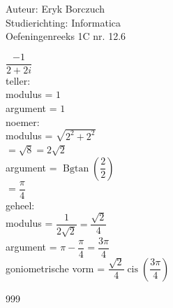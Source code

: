 \documentclass[a4paper]{article}
\begin{document}
  
\noindent \large Auteur: Eryk Borczuch \\
\noindent \large Studierichting: Informatica\\
\noindent \large Oefeningenreeks 1C nr. 12.6\\

\medskip

\normalsize

$\dfrac{-1}{2+2i}$\\

teller: \\

modulus = $1$\\

argument = $1$\\


noemer:\\

modulus = $\sqrt{2^2+2^2}$\\

$= \sqrt{8} = 2 \sqrt{2}$\\

argument = $\operatorname{Bgtan} \left(\dfrac{2}{2}\right)$\\

$= \dfrac{\pi}{4}$\\

geheel:\\

modulus = $\dfrac{1}{2\sqrt{2}} = \dfrac{\sqrt{2}}{4}$\\

argument = $\pi - \dfrac{\pi}{4} = \dfrac{3 \pi}{4}$\\

goniometrische vorm = $ \dfrac{\sqrt{2}}{4} \operatorname{cis} \left(\dfrac{3\pi}{4}\right)$




\begin{thebibliography}{999}
\end{thebibliography}
\end{document}
